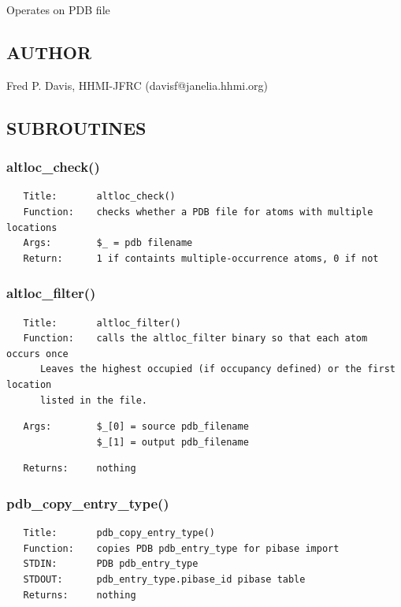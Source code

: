\documentclass{article}
\begin{document}
Operates on PDB file

\subsection*{AUTHOR\label{pibase::PDB_AUTHOR}}


Fred P. Davis, HHMI-JFRC (davisf@janelia.hhmi.org)

\subsection*{SUBROUTINES\label{pibase::PDB_SUBROUTINES}}
\subsubsection*{altloc\_check()\label{pibase::PDB_altloc_check_}}
\begin{verbatim}
   Title:       altloc_check()
   Function:    checks whether a PDB file for atoms with multiple locations
   Args:        $_ = pdb filename
   Return:      1 if containts multiple-occurrence atoms, 0 if not
\end{verbatim}
\subsubsection*{altloc\_filter()\label{pibase::PDB_altloc_filter_}}
\begin{verbatim}
   Title:       altloc_filter()
   Function:    calls the altloc_filter binary so that each atom occurs once
      Leaves the highest occupied (if occupancy defined) or the first location
      listed in the file.
\end{verbatim}
\begin{verbatim}
   Args:        $_[0] = source pdb_filename
                $_[1] = output pdb_filename
\end{verbatim}
\begin{verbatim}
   Returns:     nothing
\end{verbatim}
\subsubsection*{pdb\_copy\_entry\_type()\label{pibase::PDB_pdb_copy_entry_type_}}
\begin{verbatim}
   Title:       pdb_copy_entry_type()
   Function:    copies PDB pdb_entry_type for pibase import
   STDIN:       PDB pdb_entry_type
   STDOUT:      pdb_entry_type.pibase_id pibase table
   Returns:     nothing
\end{verbatim}
\end{document}
